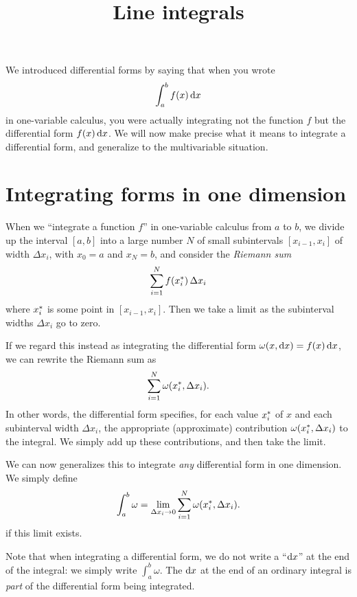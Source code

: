 \documentclass[12pt]{amsart}
\title{Line integrals}
\begin{document}
\maketitle

We introduced differential forms by saying that when you wrote
\[ \int_a^b f(x) \,{\mathrm{d} x} \]
in one-variable calculus, you were actually integrating not the function $f$ but the differential form $f(x)\,{\mathrm{d} x}$.
We will now make precise what it means to integrate a differential form, and generalize to the multivariable situation.

\section{Integrating forms in one dimension}
\label{sec:integrating-forms}

When we ``integrate a function $f$'' in one-variable calculus from $a$ to $b$, we divide up the interval $[a,b]$ into a large number $N$ of small subintervals $[x_{i-1},x_i]$ of width $\Delta x_i$, with $x_0 = a$ and $x_N=b$, and consider the \emph{Riemann sum}
\[ \sum_{i=1}^N f({x}_{i}^*)\, \Delta x_i \]
where ${x}_{i}^*$ is some point in $[x_{i-1},x_i]$.
Then we take a limit as the subinterval widths $\Delta x_i$ go to zero.

If we regard this instead as integrating the differential form $\omega(x,{\mathrm{d} x}) = f(x)\, {\mathrm{d} x}$, we can rewrite the Riemann sum as
\[ \sum_{i=1}^N \omega({x}_{i}^*,\Delta x_i). \]
In other words, the differential form specifies, for each value ${x}_{i}^*$ of $x$ and each subinterval width $\Delta x_i$, the appropriate (approximate) contribution $\omega({x}_{i}^*,\Delta x_i)$ to the integral.
We simply add up these contributions, and then take the limit.

We can now generalizes this to integrate \emph{any} differential form in one dimension.
We simply define
\[ \int_a^b \omega = \lim_{\Delta x_i \to 0} \sum_{i=1}^N \omega({x}_{i}^*,\Delta x_i). \]
if this limit exists.

Note that when integrating a differential form, we do not write a ``${\mathrm{d} x}$'' at the end of the integral: we simply write $\int_a^b \omega$.
The ${\mathrm{d} x}$ at the end of an ordinary integral is \emph{part} of the differential form being integrated.
\end{document}
